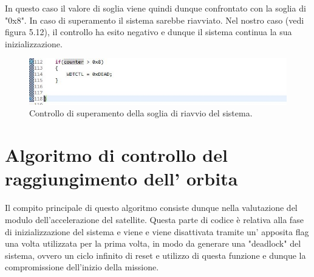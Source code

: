 \documentclass[LaM,binding=0.6cm]{../sapthesis}
\begin{document}
In questo caso il valore di soglia viene quindi dunque confrontato con la soglia di "0x8". In caso di superamento il sistema sarebbe riavviato. Nel nostro caso (vedi figura 5.12), il controllo ha esito negativo e dunque il sistema continua la sua inizializzazione.\newline

\begin{figure}[htbp]
\centerline{\includegraphics[scale=0.7]{examples/9_ControlloDelNumeroDiFaultNO_RIAVVIO.JPG}}
\caption{Controllo di superamento della soglia di riavvio del sistema.}
\label{fig}
\end{figure}


\newpage





\chapter{Algoritmo di controllo del raggiungimento dell' orbita}
Il compito principale di questo algoritmo consiste dunque nella valutazione del modulo dell’accelerazione del satellite. Questa parte di codice è relativa alla fase di inizializzazione del sistema e viene e viene disattivata tramite un' apposita flag una volta utilizzata per la prima volta, in modo da generare una "deadlock" del sistema, ovvero un ciclo infinito di reset e utilizzo di questa funzione e dunque la compromissione dell'inizio  della missione.
\end{document}
